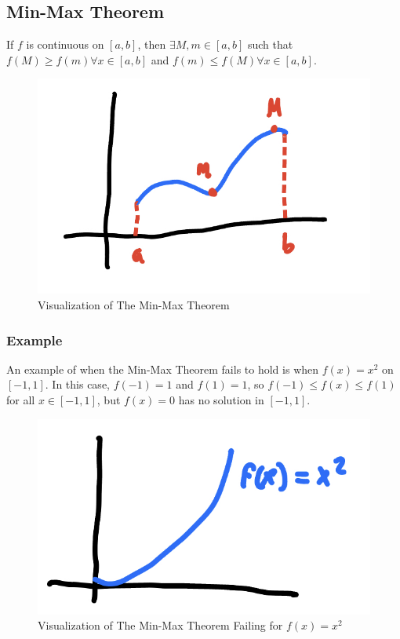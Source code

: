 \documentclass{article}
\begin{document}
\subsection*{Min-Max Theorem}

If $f$ is continuous on $[a,b]$, then $\exists M, m \in [a,b]$ such that $f(M) \geq f(m) \forall x \in [a,b]$ and $f(m) \leq f(M) \forall x \in [a,b]$.

\begin{figure}[!htb]
    \centering
    \includegraphics[scale=0.15]{min-max-theorem.jpeg}
    \caption{Visualization of The Min-Max Theorem}
    \label{fig:min-max-theorem}
\end{figure}

\newpage
\subsubsection*{Example}

An example of when the Min-Max Theorem fails to hold is when $f(x) = x^2$ on $[-1,1]$. In this case, $f(-1) = 1$ and $f(1) = 1$, so $f(-1) \leq f(x) \leq f(1)$ for all $x \in [-1,1]$, but $f(x) = 0$ has no solution in $[-1,1]$.

\begin{figure}[!htb]
    \centering
    \includegraphics[scale=0.15]{min-max-theorem-fail.jpeg}
    \caption{Visualization of The Min-Max Theorem Failing for $f(x) = x^2$}
    \label{fig:min-max-theorem-fail}
\end{figure}
\end{document}
